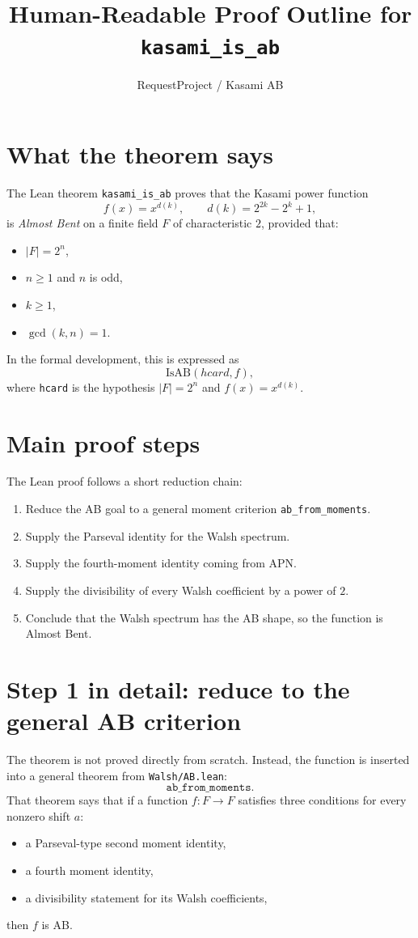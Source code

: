 \documentclass[11pt]{article}
\title{Human-Readable Proof Outline for \texttt{kasami\_is\_ab}}
\author{RequestProject / Kasami AB}
\date{}
\begin{document}
\maketitle

\section{What the theorem says}
The Lean theorem \texttt{kasami\_is\_ab} proves that the Kasami power function
\[
  f(x) = x^{d(k)}, \qquad d(k) = 2^{2k} - 2^k + 1,
\]
is \emph{Almost Bent} on a finite field $F$ of characteristic $2$, provided that:
\begin{itemize}
  \item $|F| = 2^n$,
  \item $n \ge 1$ and $n$ is odd,
  \item $k \ge 1$,
  \item $\gcd(k,n) = 1$.
\end{itemize}

In the formal development, this is expressed as
\[
  \mathrm{IsAB}(hcard, f),
\]
where \texttt{hcard} is the hypothesis $|F| = 2^n$ and $f(x) = x^{d(k)}$.

\section{Main proof steps}
The Lean proof follows a short reduction chain:
\begin{enumerate}
  \item Reduce the AB goal to a general moment criterion \texttt{ab\_from\_moments}.
  \item Supply the Parseval identity for the Walsh spectrum.
  \item Supply the fourth-moment identity coming from APN.
  \item Supply the divisibility of every Walsh coefficient by a power of $2$.
  \item Conclude that the Walsh spectrum has the AB shape, so the function is Almost Bent.
\end{enumerate}

\section{Step 1 in detail: reduce to the general AB criterion}
The theorem is not proved directly from scratch. Instead, the function is inserted into a general theorem from \texttt{Walsh/AB.lean}:
\[
  \texttt{ab\_from\_moments}.
\]
That theorem says that if a function $f : F \to F$ satisfies three conditions for every nonzero shift $a$:
\begin{itemize}
  \item a Parseval-type second moment identity,
  \item a fourth moment identity,
  \item a divisibility statement for its Walsh coefficients,
\end{itemize}
then $f$ is AB.
\end{document}
